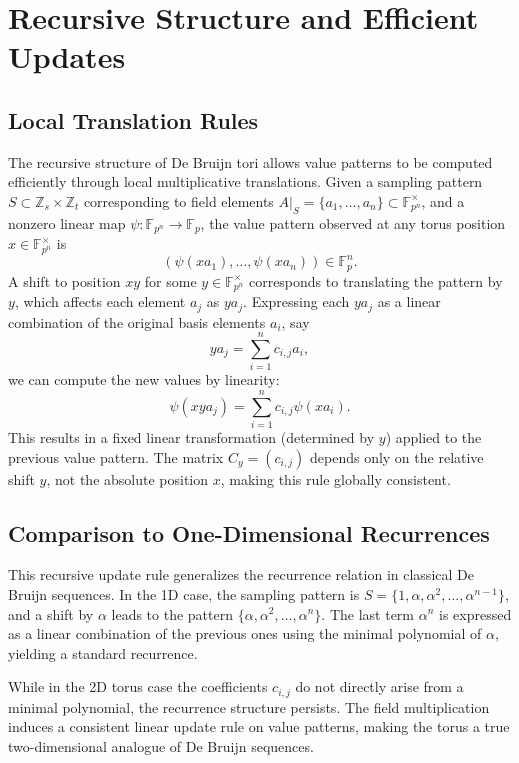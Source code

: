 \documentclass{article}
\begin{document}
\section{Recursive Structure and Efficient Updates}
\subsection{ Local Translation Rules }
The recursive structure of De Bruijn tori allows value patterns to be computed efficiently through local multiplicative translations. Given a sampling pattern \( S \subset \mathbb{Z}_s \times \mathbb{Z}_t \) corresponding to field elements \( A|_S = \{a_1, \dots, a_n\} \subset \mathbb{F}_{p^n}^\times \), and a nonzero linear map \( \psi: \mathbb{F}_{p^n} \to \mathbb{F}_p \), the value pattern observed at any torus position \( x \in \mathbb{F}_{p^n}^\times \) is
\[
(\psi(x a_1), \dots, \psi(x a_n)) \in \mathbb{F}_p^n.
\]
A shift to position \( x y \) for some \( y \in \mathbb{F}_{p^n}^\times \) corresponds to translating the pattern by \( y \), which affects each element \( a_j \) as \( y a_j \). Expressing each \( y a_j \) as a linear combination of the original basis elements \( a_i \), say
\[
y a_j = \sum_{i=1}^n c_{i,j} a_i,
\]
we can compute the new values by linearity:
\[
\psi(x y a_j) = \sum_{i=1}^n c_{i,j} \psi(x a_i).
\]
This results in a fixed linear transformation (determined by \( y \)) applied to the previous value pattern. The matrix \( C_y = (c_{i,j}) \) depends only on the relative shift \( y \), not the absolute position \( x \), making this rule globally consistent.

\subsection{Comparison to One-Dimensional Recurrences  }

This recursive update rule generalizes the recurrence relation in classical De Bruijn sequences. In the 1D case, the sampling pattern is \( S = \{1, \alpha, \alpha^2, \dots, \alpha^{n-1}\} \), and a shift by \( \alpha \) leads to the pattern \( \{\alpha, \alpha^2, \dots, \alpha^n\} \). The last term \( \alpha^n \) is expressed as a linear combination of the previous ones using the minimal polynomial of \( \alpha \), yielding a standard recurrence.

While in the 2D torus case the coefficients \( c_{i,j} \) do not directly arise from a minimal polynomial, the recurrence structure persists. The field multiplication induces a consistent linear update rule on value patterns, making the torus a true two-dimensional analogue of De Bruijn sequences.
\end{document}
